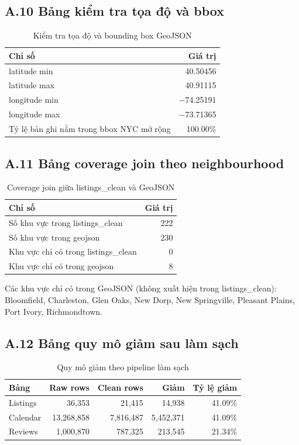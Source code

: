 \subsection*{A.10 Bảng kiểm tra tọa độ và bbox}

\begin{table}[H]
\centering
\caption{Kiểm tra tọa độ và bounding box GeoJSON}\label{tab:A10}
\begin{tabular}{|l|r|}
\hline
\textbf{Chỉ số} & \textbf{Giá trị} \\
\hline
latitude min  & 40.50456 \\
latitude max  & 40.91115 \\
longitude min & $-$74.25191 \\
longitude max & $-$73.71365 \\
Tỷ lệ bản ghi nằm trong bbox NYC mở rộng & 100.00\% \\
\hline
\end{tabular}
\end{table}

\subsection*{A.11 Bảng coverage join theo neighbourhood}

\begin{table}[H]
\centering
\caption{Coverage join giữa listings\_clean và GeoJSON}\label{tab:A11}
\begin{tabular}{|l|r|}
\hline
\textbf{Chỉ số} & \textbf{Giá trị} \\
\hline
Số khu vực trong listings\_clean        & 222 \\
Số khu vực trong geojson                & 230 \\
Khu vực chỉ có trong listings\_clean   & 0 \\
Khu vực chỉ có trong geojson           & 8 \\
\hline
\end{tabular}
\end{table}

Các khu vực chỉ có trong GeoJSON (không xuất hiện trong listings\_clean): Bloomfield, Charleston, Glen Oaks, New Dorp, New Springville, Pleasant Plains, Port Ivory, Richmondtown.

\subsection*{A.12 Bảng quy mô giảm sau làm sạch}

\begin{table}[H]
\centering
\caption{Quy mô giảm theo pipeline làm sạch}\label{tab:A12}
\begin{tabular}{|l|r|r|r|r|}
\hline
\textbf{Bảng} & \textbf{Raw rows} & \textbf{Clean rows} & \textbf{Giảm} & \textbf{Tỷ lệ giảm} \\
\hline
Listings & 36,353     & 21,415    & 14,938    & 41.09\% \\
Calendar & 13,268,858 & 7,816,487 & 5,452,371 & 41.09\% \\
Reviews  & 1,000,870  & 787,325   & 213,545   & 21.34\% \\
\hline
\end{tabular}
\end{table}

